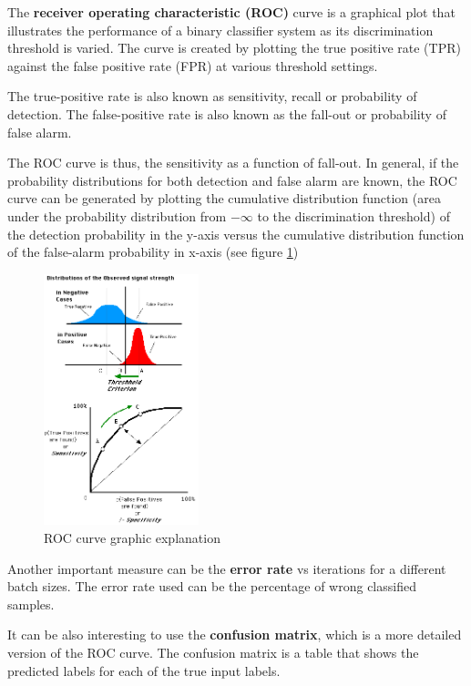 \documentclass[]{article}
\begin{document}
The \textbf{receiver operating characteristic (ROC)} curve is a graphical plot that illustrates the performance of a binary classifier system as its discrimination threshold is varied. The curve is created by plotting the true positive rate (TPR) against the false positive rate (FPR) at various threshold settings.

The true-positive rate is also known as sensitivity, recall or probability of detection. The false-positive rate is also known as the fall-out or probability of false alarm. 

The ROC curve is thus, the sensitivity as a function of fall-out. In general, if the probability distributions for both detection and false alarm are known, the ROC curve can be generated by plotting the cumulative distribution function (area under the probability distribution from $-\infty$  to the discrimination threshold) of the detection probability in the y-axis versus the cumulative distribution function of the false-alarm probability in x-axis (see figure \ref{img:ROC})\cite{wikiROC}

\begin{figure}[htpb!]
\centering
\includegraphics[width= 0.4\textwidth]{images/ROCfig}
\caption{ROC curve graphic explanation \cite{wikiwand} \label{img:ROC}}
\end{figure}

Another important measure can be the \textbf{error rate} vs iterations for a different batch sizes. The error rate used can be the percentage of wrong classified samples.

It can be also interesting to use the \textbf{confusion matrix}, which is a more detailed version of the ROC curve. The confusion matrix is a table that shows the predicted labels for each of the true input labels.
\end{document}
